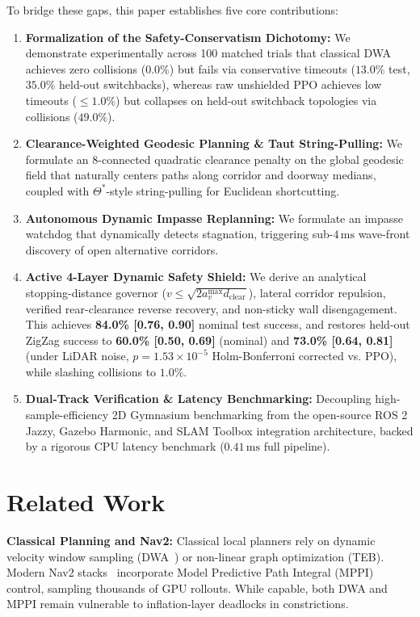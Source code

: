 \documentclass[runningheads]{llncs}
\begin{document}
To bridge these gaps, this paper establishes five core contributions:
\begin{enumerate}
    \item \textbf{Formalization of the Safety-Conservatism Dichotomy:} We demonstrate experimentally across 100 matched trials that classical DWA achieves zero collisions ($0.0\%$) but fails via conservative timeouts ($13.0\%$ test, $35.0\%$ held-out switchbacks), whereas raw unshielded PPO achieves low timeouts ($\le 1.0\%$) but collapses on held-out switchback topologies via collisions ($49.0\%$).
    \item \textbf{Clearance-Weighted Geodesic Planning \& Taut String-Pulling:} We formulate an 8-connected quadratic clearance penalty on the global geodesic field that naturally centers paths along corridor and doorway medians, coupled with $\Theta^*$-style string-pulling for Euclidean shortcutting.
    \item \textbf{Autonomous Dynamic Impasse Replanning:} We formulate an impasse watchdog that dynamically detects stagnation, triggering sub-$4\,\text{ms}$ wave-front discovery of open alternative corridors.
    \item \textbf{Active 4-Layer Dynamic Safety Shield:} We derive an analytical stopping-distance governor ($v \le \sqrt{2 a_v^{\max} d_{\text{clear}}}$), lateral corridor repulsion, verified rear-clearance reverse recovery, and non-sticky wall disengagement. This achieves \textbf{84.0\% [0.76, 0.90]} nominal test success, and restores held-out ZigZag success to \textbf{60.0\% [0.50, 0.69]} (nominal) and \textbf{73.0\% [0.64, 0.81]} (under LiDAR noise, $p = 1.53 \times 10^{-5}$ Holm-Bonferroni corrected vs. PPO), while slashing collisions to $1.0\%$.
    \item \textbf{Dual-Track Verification \& Latency Benchmarking:} Decoupling high-sample-efficiency 2D Gymnasium benchmarking from the open-source ROS 2 Jazzy, Gazebo Harmonic, and SLAM Toolbox integration architecture, backed by a rigorous CPU latency benchmark ($0.41\,\text{ms}$ full pipeline).
\end{enumerate}

\section{Related Work}
\textbf{Classical Planning and Nav2:} Classical local planners rely on dynamic velocity window sampling (DWA~\cite{fox1997dwa}) or non-linear graph optimization (TEB). Modern Nav2 stacks~\cite{macenski2020marathon, macenski2023survey} incorporate Model Predictive Path Integral (MPPI) control, sampling thousands of GPU rollouts. While capable, both DWA and MPPI remain vulnerable to inflation-layer deadlocks in constrictions.
\end{document}
